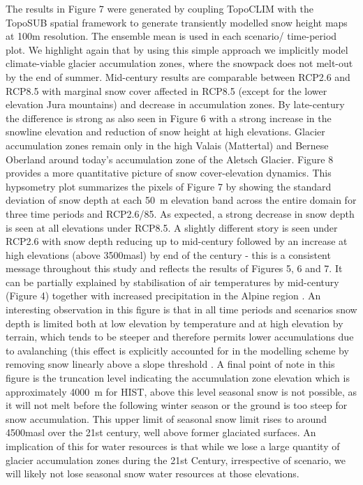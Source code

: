 \documentclass[hess, manuscript]{copernicus}
\begin{document}
The results in Figure 7 were generated by coupling TopoCLIM with the TopoSUB spatial framework to generate transiently modelled snow height maps at 100m resolution. The ensemble mean is used in each scenario/ time-period plot. We highlight again that by using this simple approach we implicitly model climate-viable glacier accumulation zones, where the snowpack does not melt-out by the end of summer. Mid-century results are comparable between RCP2.6 and RCP8.5 with marginal snow cover affected in RCP8.5 (except for the lower elevation Jura mountains) and decrease in accumulation zones. By late-century the difference is strong as also seen in Figure 6 with a strong increase in the snowline elevation and reduction of snow height at high elevations. Glacier accumulation zones remain only in the high Valais (Mattertal) and Bernese Oberland around today's accumulation zone of the Aletsch Glacier. Figure 8 provides a more quantitative picture of snow cover-elevation dynamics. This hypsometry plot summarizes the pixels of Figure 7 by showing the standard deviation of snow depth at each 50~m elevation band across the entire domain for three time periods and RCP2.6/85. As expected, a strong decrease in snow depth is seen at all elevations under RCP8.5. A slightly different story is seen under RCP2.6 with snow depth reducing up to mid-century followed by an increase at high elevations (above 3500\unit{masl}) by end of the century - this is a consistent message throughout this study and reflects the results of Figures 5, 6 and 7. It can be partially explained by stabilisation of air temperatures by mid-century (Figure 4) together with increased precipitation in the Alpine region \citep{Jacob2014-yw, Smiatek2016-lu}. An interesting observation in this figure is that in all time periods and scenarios snow depth is limited both at low elevation by temperature and at high elevation by terrain, which tends to be steeper and therefore permits lower accumulations due to avalanching (this effect is explicitly accounted for in the modelling scheme by removing snow linearly above a slope threshold \citep[c.f.][]{Fiddes2015-lx}. A final point of note in this figure is the truncation level indicating the accumulation zone elevation which is approximately 4000~m for HIST, above this level seasonal snow is not possible, as it will not melt before the following winter season or the ground is too steep for snow accumulation. This upper limit of seasonal snow limit rises to around 4500\unit{masl} over the 21st century, well above former glaciated surfaces. An implication of this for water resources is that while we lose a large quantity of glacier accumulation zones during the 21st Century, irrespective of scenario, we will likely not lose seasonal snow water resources at those elevations.
\end{document}
